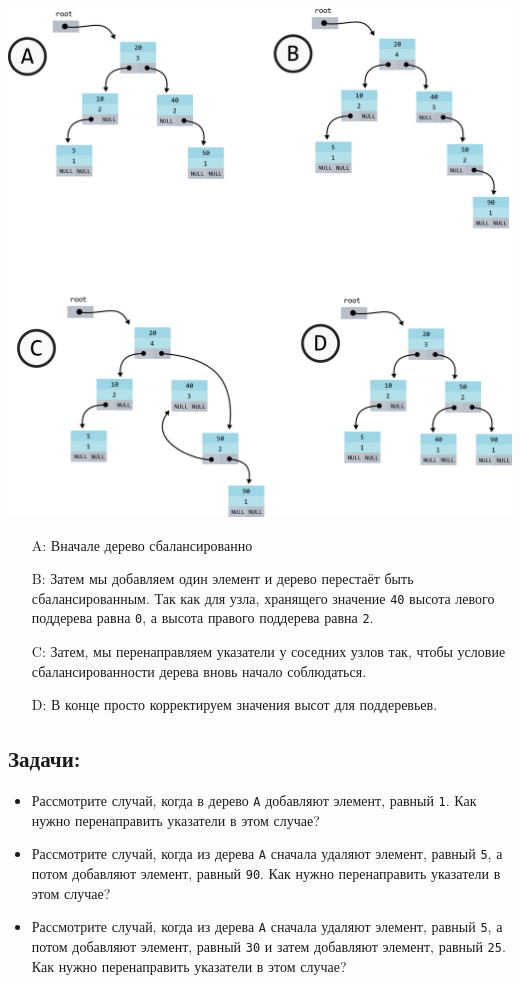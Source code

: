 \documentclass{article}
\begin{document}
\begin{center}
\includegraphics[scale=0.9]{../images/avl_example.png}
\end{center}

\begin{enumerate}
\item[A:] Вначале дерево сбалансированно
\item[B:] Затем мы добавляем один элемент и дерево перестаёт быть сбалансированным. Так как для узла, хранящего значение \texttt{40} высота левого поддерева равна \texttt{0}, а высота правого поддерева равна \texttt{2}.
\item[C:] Затем, мы перенаправляем указатели у соседних узлов так, чтобы условие сбалансированности дерева вновь начало соблюдаться.
\item[D:] В конце просто корректируем значения высот для поддеревьев.
\end{enumerate}

\subsection*{Задачи:}
\begin{itemize}
\item Рассмотрите случай, когда в дерево \texttt{A} добавляют элемент, равный \texttt{1}. Как нужно перенаправить указатели в этом случае?
\item Рассмотрите случай, когда из дерева \texttt{A} сначала удаляют элемент, равный \texttt{5}, а потом добавляют элемент, равный \texttt{90}. Как нужно перенаправить указатели в этом случае?
\item Рассмотрите случай, когда из дерева \texttt{A} сначала удаляют элемент, равный \texttt{5}, а потом добавляют элемент, равный \texttt{30} и затем добавляют элемент, равный \texttt{25}. Как нужно перенаправить указатели в этом случае?
\end{itemize}
\end{document}
